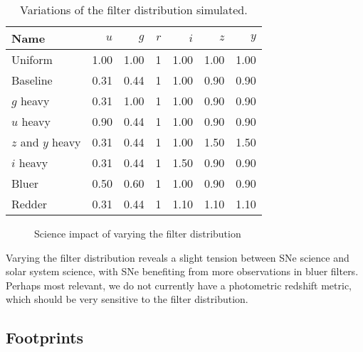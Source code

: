 \begin{table}
\begin{centering}
\begin{tabular}{lrrrrrr}
              Name &     $u$ &     $g$ &  $r$ &     $i$ &     $z$ &     $y$ \\
\hline
           Uniform & 1.00 & 1.00 &  1 & 1.00 & 1.00 & 1.00 \\
          Baseline & 0.31 & 0.44 &  1 & 1.00 & 0.90 & 0.90 \\
         $g$ heavy & 0.31 & 1.00 &  1 & 1.00 & 0.90 & 0.90 \\
         $u$ heavy & 0.90 & 0.44 &  1 & 1.00 & 0.90 & 0.90 \\
        $z$ and $y$ heavy & 0.31 & 0.44 &  1 & 1.00 & 1.50 & 1.50 \\
         $i$ heavy & 0.31 & 0.44 &  1 & 1.50 & 0.90 & 0.90 \\
             Bluer & 0.50 & 0.60 &  1 & 1.00 & 0.90 & 0.90 \\
            Redder & 0.31 & 0.44 &  1 & 1.10 & 1.10 & 1.10 \\
\hline
\end{tabular}
\caption{Variations of the filter distribution simulated.}\label{table:filtdist}
\end{centering}
\end{table}

\begin{figure}
\caption{Science impact of varying the filter distribution}\label{}
\end{figure}


Varying the filter distribution reveals a slight tension between SNe science and solar system science, with SNe benefiting from more observations in bluer filters. Perhaps most relevant, we do not currently have a photometric redshift metric, which should be very sensitive to the filter distribution.


\subsection{Footprints}

